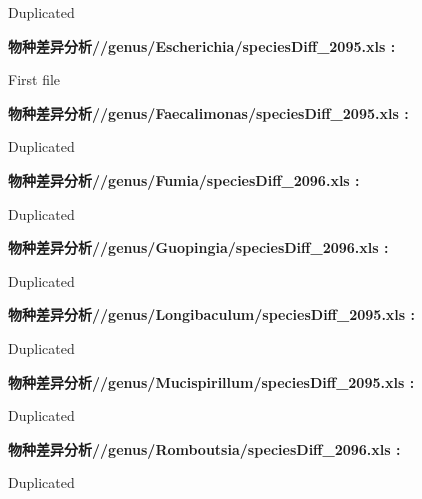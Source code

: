 \documentclass[
]{article}
\begin{document}
\begin{center}
\begin{tcolorbox}[colback=gray!10, colframe=gray!50, width=0.9\linewidth, arc=1mm, boxrule=0.5pt]
    Duplicated

\vspace{2em}


\textbf{
物种差异分析//genus/Escherichia/speciesDiff\_2095.xls
:}

\vspace{0.5em}

    First file

\vspace{2em}


\textbf{
物种差异分析//genus/Faecalimonas/speciesDiff\_2095.xls
:}

\vspace{0.5em}

    Duplicated

\vspace{2em}


\textbf{
物种差异分析//genus/Fumia/speciesDiff\_2096.xls
:}

\vspace{0.5em}

    Duplicated

\vspace{2em}


\textbf{
物种差异分析//genus/Guopingia/speciesDiff\_2096.xls
:}

\vspace{0.5em}

    Duplicated

\vspace{2em}


\textbf{
物种差异分析//genus/Longibaculum/speciesDiff\_2095.xls
:}

\vspace{0.5em}

    Duplicated

\vspace{2em}


\textbf{
物种差异分析//genus/Mucispirillum/speciesDiff\_2095.xls
:}

\vspace{0.5em}

    Duplicated

\vspace{2em}


\textbf{
物种差异分析//genus/Romboutsia/speciesDiff\_2096.xls
:}

\vspace{0.5em}

    Duplicated

\vspace{2em}



\end{tcolorbox}
\end{center}
\end{document}
